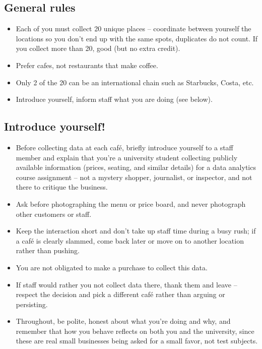 \documentclass[11pt,a4paper]{article}
\begin{document}
\subsection*{General rules}

\begin{itemize}
\item Each of you must collect 20 unique places -- coordinate between yourself the locations so you don't end up with the same spots, duplicates do not count. If you collect more than 20, good (but no extra credit).
\item Prefer cafes, not restaurants that make coffee.
\item Only 2 of the 20 can be an international chain such as Starbucks, Costa, etc.
\item Introduce yourself, inform staff what you are doing (see below).
\end{itemize}

\subsection*{Introduce yourself!}

\begin{itemize}
\item Before collecting data at each caf\'e, briefly introduce yourself to a staff member and explain that you're a university student collecting publicly available information (prices, seating, and similar details) for a data analytics course assignment -- not a mystery shopper, journalist, or inspector, and not there to critique the business.
\item Ask before photographing the menu or price board, and never photograph other customers or staff.
\item Keep the interaction short and don't take up staff time during a busy rush; if a caf\'e is clearly slammed, come back later or move on to another location rather than pushing.
\item You are not obligated to make a purchase to collect this data.
\item If staff would rather you not collect data there, thank them and leave -- respect the decision and pick a different caf\'e rather than arguing or persisting.
\item Throughout, be polite, honest about what you're doing and why, and remember that how you behave reflects on both you and the university, since these are real small businesses being asked for a small favor, not test subjects.
\end{itemize}
\end{document}
